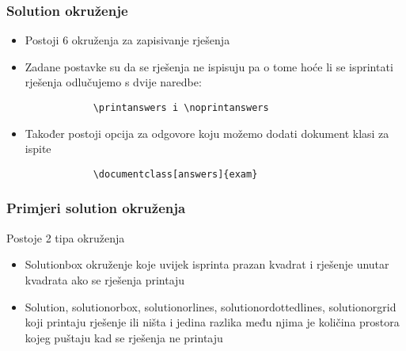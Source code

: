 \documentclass{beamer}
\begin{document}
	\begin{frame}[fragile]
		\frametitle{Solution okruženje}
		\begin{itemize}
		\item Postoji 6 okruženja za zapisivanje rješenja
		\item  Zadane postavke su da se rješenja ne ispisuju pa o tome hoće li se isprintati rješenja odlučujemo s dvije naredbe:
			\begin{verbatim}
			\printanswers i \noprintanswers 
			\end{verbatim}
		\item Također postoji opcija za odgovore koju možemo dodati dokument klasi za ispite
			\begin{verbatim}
			\documentclass[answers]{exam}
			\end{verbatim}
		\end{itemize}
	\end{frame}

	\begin{frame}[fragile]
		\frametitle{Primjeri solution okruženja}
		Postoje 2 tipa okruženja 
		\begin{itemize}
		\item Solutionbox okruženje koje uvijek isprinta prazan kvadrat i rješenje unutar kvadrata ako se rješenja printaju 
		\item Solution, solutionorbox, solutionorlines, solutionordottedlines, solutionorgrid koji printaju rješenje ili ništa i jedina razlika među njima je količina prostora kojeg puštaju kad se 				rješenja ne printaju
		\end{itemize}
	\end{frame}
	
\end{document}
